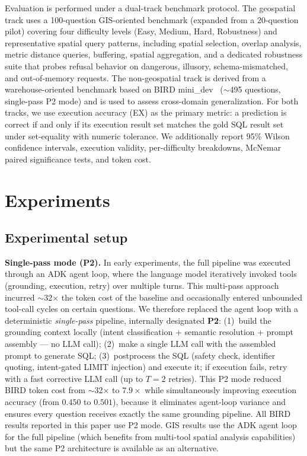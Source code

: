 \documentclass[11pt]{article}
\begin{document}
Evaluation is performed under a dual-track benchmark protocol. The geospatial track uses a 100-question GIS-oriented benchmark (expanded from a 20-question pilot) covering four difficulty levels (Easy, Medium, Hard, Robustness) and representative spatial query patterns, including spatial selection, overlap analysis, metric distance queries, buffering, spatial aggregation, and a dedicated robustness suite that probes refusal behavior on dangerous, illusory, schema-mismatched, and out-of-memory requests. The non-geospatial track is derived from a warehouse-oriented benchmark based on BIRD mini\_dev~\cite{li2023bird} ($\sim$495 questions, single-pass P2 mode) and is used to assess cross-domain generalization. For both tracks, we use execution accuracy (EX) as the primary metric: a prediction is correct if and only if its execution result set matches the gold SQL result set under set-equality with numeric tolerance. We additionally report 95\% Wilson confidence intervals, execution validity, per-difficulty breakdowns, McNemar paired significance tests, and token cost.

\section{Experiments}
\label{sec:experiments}

\subsection{Experimental setup}

\noindent\textbf{Single-pass mode (P2).} In early experiments, the full pipeline was executed through an ADK agent loop, where the language model iteratively invoked tools (grounding, execution, retry) over multiple turns. This multi-pass approach incurred $\sim$32$\times$ the token cost of the baseline and occasionally entered unbounded tool-call cycles on certain questions. We therefore replaced the agent loop with a deterministic \emph{single-pass} pipeline, internally designated \textbf{P2}: (1)~build the grounding context locally (intent classification + semantic resolution + prompt assembly --- no LLM call); (2)~make a single LLM call with the assembled prompt to generate SQL; (3)~postprocess the SQL (safety check, identifier quoting, intent-gated LIMIT injection) and execute it; if execution fails, retry with a fast corrective LLM call (up to $T=2$ retries). This P2 mode reduced BIRD token cost from $\sim$32$\times$ to $7.9\times$ while simultaneously improving execution accuracy (from $0.450$ to $0.501$), because it eliminates agent-loop variance and ensures every question receives exactly the same grounding pipeline. All BIRD results reported in this paper use P2 mode. GIS results use the ADK agent loop for the full pipeline (which benefits from multi-tool spatial analysis capabilities) but the same P2 architecture is available as an alternative.
\end{document}

